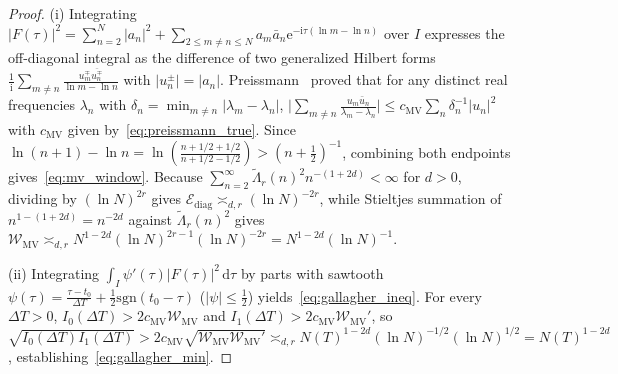 \documentclass[11pt,reqno]{amsart}
\theoremstyle{definition}
\theoremstyle{remark}
\numberwithin{equation}{section}
\newcommand{\dd}{\,\mathrm{d}}
\newcommand{\ii}{\mathrm{i}}
\newcommand{\ee}{\mathrm{e}}
\begin{document}
\begin{proof}
(i) Integrating $\lvert F(\tau)\rvert^2 = \sum_{n=2}^N \lvert a_n\rvert^2 + \sum_{2 \le m \neq n \le N} a_m\bar{a}_n\ee^{-\ii\tau(\ln m - \ln n)}$ over $I$ expresses the off-diagonal integral as the difference of two generalized Hilbert forms $\frac{1}{\ii}\sum_{m \neq n} \frac{u_m^\mp \overline{u_n^\mp}}{\ln m - \ln n}$ with $\lvert u_n^\pm\rvert = \lvert a_n\rvert$. Preissmann~\cite[Theorem~1]{preissmann1984} proved that for any distinct real frequencies $\lambda_n$ with $\delta_n = \min_{m \neq n}\lvert\lambda_m - \lambda_n\rvert$, $\bigl\lvert\sum_{m \neq n} \frac{u_m\bar{u}_n}{\lambda_m - \lambda_n}\bigr\rvert \le c_{\mathrm{MV}}\sum_n \delta_n^{-1}\lvert u_n\rvert^2$ with $c_{\mathrm{MV}}$ given by~\eqref{eq:preissmann_true}. Since $\ln(n+1) - \ln n = \ln(\frac{n+1/2+1/2}{n+1/2-1/2}) > (n + \frac{1}{2})^{-1}$, combining both endpoints gives~\eqref{eq:mv_window}. Because $\sum_{n=2}^{\infty}\widetilde{\Lambda}_r(n)^2 n^{-(1+2d)} < \infty$ for $d > 0$, dividing by $(\ln N)^{2r}$ gives $\mathcal{E}_{\mathrm{diag}} \asymp_{d,r} (\ln N)^{-2r}$, while Stieltjes summation of $n^{1-(1+2d)} = n^{-2d}$ against $\widetilde{\Lambda}_r(n)^2$ gives $\mathcal{W}_{\mathrm{MV}} \asymp_{d,r} N^{1-2d}(\ln N)^{2r-1}(\ln N)^{-2r} = N^{1-2d}(\ln N)^{-1}$.

(ii) Integrating $\int_I \psi'(\tau)\lvert F(\tau)\rvert^2\dd\tau$ by parts with sawtooth $\psi(\tau) = \frac{\tau - t_0}{\Delta T} + \frac{1}{2}\mathrm{sgn}(t_0 - \tau)$ ($\lvert\psi\rvert \le \frac{1}{2}$) yields~\eqref{eq:gallagher_ineq}. For every $\Delta T > 0$, $I_0(\Delta T) > 2c_{\mathrm{MV}}\mathcal{W}_{\mathrm{MV}}$ and $I_1(\Delta T) > 2c_{\mathrm{MV}}\mathcal{W}_{\mathrm{MV}}'$, so $\sqrt{I_0(\Delta T)I_1(\Delta T)} > 2c_{\mathrm{MV}}\sqrt{\mathcal{W}_{\mathrm{MV}}\mathcal{W}_{\mathrm{MV}}'} \asymp_{d,r} N(T)^{1-2d}(\ln N)^{-1/2}(\ln N)^{1/2} = N(T)^{1-2d}$, establishing~\eqref{eq:gallagher_min}.
\end{proof}
\end{document}
